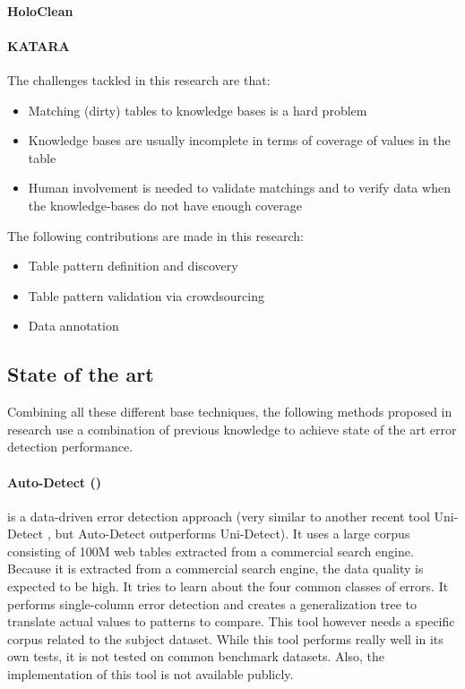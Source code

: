 \paragraph{HoloClean \cite{Rekatsinas2017-iw}}

\paragraph{KATARA \cite{Chu2015-fs}}
The challenges tackled in this research are that:
\begin{itemize}
    \item Matching (dirty) tables to knowledge bases is a hard problem
    \item Knowledge bases are usually incomplete in terms of coverage of values in the table
    \item Human involvement is needed to validate matchings and to verify data when the knowledge-bases do not have enough coverage
\end{itemize}
The following contributions are made in this research:
\begin{itemize}
    \item Table pattern definition and discovery
    \item Table pattern validation via crowdsourcing
    \item Data annotation
\end{itemize}


\subsection{State of the art}
Combining all these different base techniques, the following methods proposed in research use a combination of previous knowledge to achieve state of the art error detection performance. 

\paragraph{Auto-Detect (\cite{Wang2019-jg})} is a data-driven error detection approach (very similar to another recent tool Uni-Detect \cite{Huang2018-er}, but Auto-Detect outperforms Uni-Detect). It uses a large corpus consisting of 100M web tables extracted from a commercial search engine. Because it is extracted from a commercial search engine, the data quality is expected to be high. It tries to learn about the four common classes of errors. It performs single-column error detection and creates a generalization tree to translate actual values to patterns to compare. This tool however needs a specific corpus related to the subject dataset. While this tool performs really well in its own tests, it is not tested on common benchmark datasets. Also, the implementation of this tool is not available publicly.

